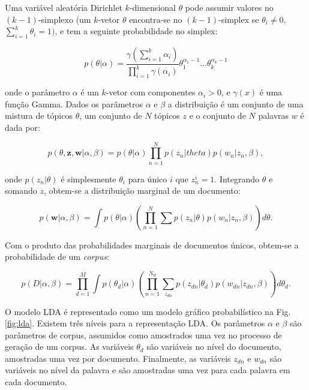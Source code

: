Uma variável aleatória Dirichlet $k$-dimensional $\theta$ pode assumir valores no $(k-1)$-simplexo (um $k$-vetor $\theta$ encontra-se no $(k-1)$-simplex se $\theta_i \neq 0$, $\sum_{i=1}^{k} \theta_i = 1)$, e tem a seguinte probabilidade no simplex:

\begin{equation}
p(\theta|\alpha) = \frac{\gamma(\sum_{i=1}^{k}\alpha_i)}{\prod_{i=1}^{k}\gamma(\alpha_i)}\theta_1^{\alpha_{1}-1}\dots\theta_{k}^{\alpha_k -1}
\end{equation}

onde o parâmetro $\alpha$ é um $k$-vetor com componentes $\alpha_i > 0$, e $\gamma(x)$ é uma função Gamma.
Dados os parâmetros $\alpha$ e $\beta$ a distribuição é um conjunto de uma mistura de tópicos $\theta$, um conjunto de $N$ tópicos $z$ e o conjunto de $N$ palavras $w$ é dada por:

\begin{equation}
p(\theta,\textbf{z},\textbf{w}|\alpha,\beta) = p(\theta|\alpha)\prod_{n=1}^{N} p(z_n|theta)p(w_n|z_n, \beta),
\end{equation}

onde $p(z_n|\theta)$ é simplesmente $\theta_i$ para único $i$ que $z_n^i = 1$. Integrando $\theta$ e somando $z$, obtem-se a distribuição marginal de um documento:

\begin{equation}
p(\textbf{w}|\alpha,\beta) = \int p(\theta|\alpha) (\prod_{n=1}^{N}\sum p(z_n|\theta) p(w_n|z_n,\beta)) d\theta.
\end{equation}

Com o produto das probabilidades marginais de documentos únicos, obtem-se a probabilidade de um \textit{corpus}:

\begin{equation}
p(D|\alpha,\beta) = \prod_{d=1}^{M} \int p(\theta_d|\alpha)( \prod_{n=1}^{N_d} \sum_{z_{dn}} p(z_{dn}|\theta_d)p(w_{dn}|z_{dn},\beta) )d\theta_d.
\end{equation}

O modelo LDA é representado como um modelo gráfico probabilístico na Fig. \ref{fig:lda}. Existem três níveis para a representação LDA. Os parâmetros $\alpha$ e $\beta$ são parâmetros de corpus, assumidos como amostrados uma vez no processo de geração de um corpus. As variáveis $\theta_d$ são variáveis no nível do documento, amostradas uma vez por documento. Finalmente, as variáveis $z_{dn}$ e $w_{dn}$ são variáveis no nível da palavra e são amostradas uma vez para cada palavra em cada documento.

